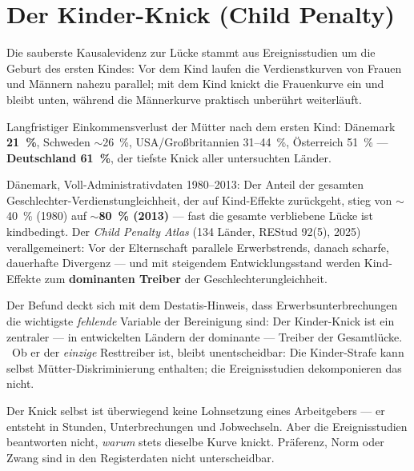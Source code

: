 \section{Der Kinder-Knick (Child Penalty)}

Die sauberste Kausalevidenz zur L\"ucke stammt aus Ereignisstudien um die Geburt
des ersten Kindes: Vor dem Kind laufen die Verdienstkurven von Frauen und
M\"annern nahezu parallel; mit dem Kind knickt die Frauenkurve ein und bleibt
unten, w\"ahrend die M\"annerkurve praktisch unber\"uhrt weiterl\"auft.

\begin{datenbox}
Langfristiger Einkommensverlust der M\"utter nach dem ersten Kind:
D\"anemark \textbf{21~\%}, Schweden \(\sim\)26~\%, USA/Gro\ss britannien
31--44~\%, \"Osterreich 51~\% --- \textbf{Deutschland 61~\%}, der tiefste Knick
aller untersuchten L\"ander. \belegt
\end{datenbox}

\begin{datenbox}
D\"anemark, Voll-Administrativdaten 1980--2013: Der Anteil der gesamten
Geschlechter-Verdienstungleichheit, der auf Kind-Effekte zur\"uckgeht, stieg von
\(\sim\)40~\% (1980) auf \textbf{\(\sim\)80~\% (2013)} --- fast die gesamte
verbliebene L\"ucke ist kindbedingt. Der \emph{Child Penalty Atlas}
(134 L\"ander, REStud 92(5), 2025) verallgemeinert: Vor der Elternschaft parallele
Erwerbstrends, danach scharfe, dauerhafte Divergenz --- und mit steigendem
Entwicklungsstand werden Kind-Effekte zum \textbf{dominanten Treiber} der
Geschlechterungleichheit. \belegt
\end{datenbox}

Der Befund deckt sich mit dem Destatis-Hinweis, dass Erwerbsunterbrechungen die
wichtigste \emph{fehlende} Variable der Bereinigung sind: Der Kinder-Knick ist
ein zentraler --- in entwickelten L\"andern der dominante --- Treiber der
Gesamtl\"ucke. \belegt\ Ob er der \emph{einzige} Resttreiber ist, bleibt
unentscheidbar: Die Kinder-Strafe kann selbst M\"utter-Diskriminierung enthalten;
die Ereignisstudien dekomponieren das nicht. \vunent

\begin{gegen}
Der Knick selbst ist \"uberwiegend keine Lohnsetzung eines Arbeitgebers ---
er entsteht in Stunden, Unterbrechungen und Jobwechseln. Aber die Ereignisstudien
beantworten nicht, \emph{warum} stets dieselbe Kurve knickt. Pr\"aferenz, Norm
oder Zwang sind in den Registerdaten nicht unterscheidbar. \umstritten
\end{gegen}

